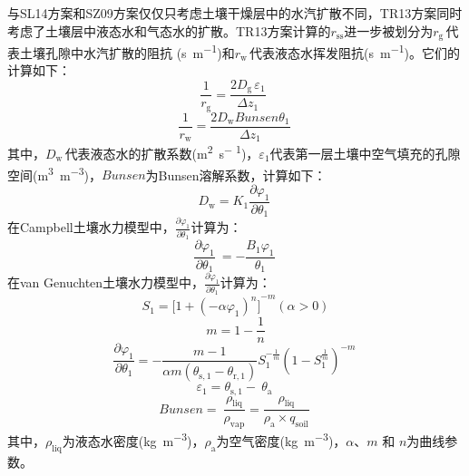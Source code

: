 \begin{enumerate}
    与SL14方案和SZ09方案仅仅只考虑土壤干燥层中的水汽扩散不同，TR13方案同时考虑了土壤层中液态水和气态水的扩散。TR13方案计算的\(r_{\mathrm{ss}}\)进一步被划分为\(r_{\mathrm{g\ }}\)代表土壤孔隙中水汽扩散的阻抗 (\unit{s.m^{-1}})和\(r_{\mathrm{w\ }}\)代表液态水挥发阻抗(\unit{s.m^{-1}})。它们的计算如下：
    \begin{equation}
      \frac{1}{r_{\mathrm{\mathrm{g}}}} = \frac{2D_{\mathrm{g\ }}\varepsilon_{1}}
      {\Delta z_{1}}\ \
    \end{equation}
    \begin{equation}
      \frac{1}{r_{\mathrm{w}}} = \frac{2D_{\mathrm{w}}Bunsen\theta_{1}}
      {\Delta z_{1}}\
    \end{equation}
    其中，\(D_{\mathrm{w\ }}\)代表液态水的扩散系数(\unit{m^{2}.s^{- 1}})，\(\varepsilon_{1}\)代表第一层土壤中空气填充的孔隙空间(\unit{m^{3}.m^{-3}})，\(Bunsen\)为Bunsen溶解系数，计算如下：
    \begin{equation}
      D_{\mathrm{w}} = K_{1}\frac{\partial\varphi_{1}}{\partial\theta_{1}}\
    \end{equation}
    在Campbell土壤水力模型中，\(\frac{\partial\varphi_{1}}{\partial\theta_{1}}\)计算为：
    \begin{equation}
      \frac{\partial\varphi_{1}}{\partial\theta_{1}}\  = - \frac{B_{1}\varphi_{1}}{\theta_{1}}\
    \end{equation}
    在van Genuchten土壤水力模型中，\(\frac{\partial\varphi_{1}}{\partial\theta_{1}}\)计算为：
    \begin{equation}
      S_{1} = {\lbrack 1 + ( - \alpha\varphi_{1})^{n}\rbrack}^{- m}(\alpha > 0)
    \end{equation}
    \begin{equation}
      m = 1-\frac{1}{n}
    \end{equation}
    \begin{equation}
      \frac{\partial\varphi_{1}}{\partial\theta_{1}} = - \frac{m - 1}{\alpha m\left( \theta_{\mathrm{s,1}} - \theta_{\mathrm{r,1}} \right)}S_{1}^{- \frac{1}{m}}\left( 1 - S_{1}^{\frac{1}{m}} \right)^{- m}\
    \end{equation}
    \begin{equation}
      \varepsilon_{1} = \theta_{\mathrm{s,1}} - \ \theta_{\mathrm{a}}\
    \end{equation}
    \begin{equation}
      Bunsen = \ \frac{\rho_{\mathrm{liq}}}{\rho_{\mathrm{vap}}} = \frac{\rho_{\mathrm{liq}}}{\rho_{\mathrm{a}} \times q_{\mathrm{soil}}}\
    \end{equation}
    其中，\(\rho_{\mathrm{liq}}\)为液态水密度(\unit{{kg}.m^{-3}})，\(\rho_{\mathrm{a}}\)为空气密度(\unit{{kg}.m^{-3}})，$\alpha$、$m$ 和 $n$为曲线参数。


\end{enumerate}
